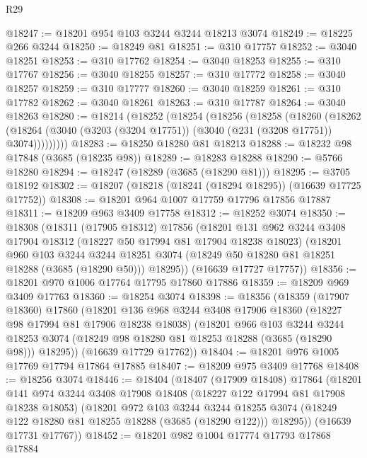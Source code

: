 \begin{lexlean}{R29}
\begin{coremodule}
@18247 := @18201 @954 @103 @3244 @3244 @18213 @3074
@18249 := @18225 @266 @3244
@18250 := @18249 @81
@18251 := @310 @17757
@18252 := @3040 @18251
@18253 := @310 @17762
@18254 := @3040 @18253
@18255 := @310 @17767
@18256 := @3040 @18255
@18257 := @310 @17772
@18258 := @3040 @18257
@18259 := @310 @17777
@18260 := @3040 @18259
@18261 := @310 @17782
@18262 := @3040 @18261
@18263 := @310 @17787
@18264 := @3040 @18263
@18280 := @18214
    (@18252
      (@18254
        (@18256
          (@18258
            (@18260
              (@18262
                (@18264 (@3040 (@3203 (@3204 @17751)) (@3040 (@231 (@3208 @17751)) @3074)))))))))
@18283 := @18250 @18280 @81 @18213
@18288 := @18232 @98 @17848 (@3685 (@18235 @98))
@18289 := @18283 @18288
@18290 := @5766 @18280
@18294 := @18247 (@18289 (@3685 (@18290 @81)))
@18295 := @3705 @18192
@18302 := @18207 (@18218 (@18241 (@18294 @18295)) (@16639 @17725 @17752))
@18308 := @18201 @964 @1007 @17759 @17796 @17856 @17887
@18311 := @18209 @963 @3409 @17758
@18312 := @18252 @3074
@18350 := @18308
    (@18311
      (@17905 @18312)
      @17856
      (@18201
        @131
        @962
        @3244
        @3408
        @17904
        @18312
        (@18227 @50 @17994 @81 @17904 @18238 @18023)
        (@18201
          @960
          @103
          @3244
          @3244
          @18251
          @3074
          (@18249 @50 @18280 @81 @18251 @18288 (@3685 (@18290 @50)))
          @18295))
      (@16639 @17727 @17757))
@18356 := @18201 @970 @1006 @17764 @17795 @17860 @17886
@18359 := @18209 @969 @3409 @17763
@18360 := @18254 @3074
@18398 := @18356
    (@18359
      (@17907 @18360)
      @17860
      (@18201
        @136
        @968
        @3244
        @3408
        @17906
        @18360
        (@18227 @98 @17994 @81 @17906 @18238 @18038)
        (@18201
          @966
          @103
          @3244
          @3244
          @18253
          @3074
          (@18249 @98 @18280 @81 @18253 @18288 (@3685 (@18290 @98)))
          @18295))
      (@16639 @17729 @17762))
@18404 := @18201 @976 @1005 @17769 @17794 @17864 @17885
@18407 := @18209 @975 @3409 @17768
@18408 := @18256 @3074
@18446 := @18404
    (@18407
      (@17909 @18408)
      @17864
      (@18201
        @141
        @974
        @3244
        @3408
        @17908
        @18408
        (@18227 @122 @17994 @81 @17908 @18238 @18053)
        (@18201
          @972
          @103
          @3244
          @3244
          @18255
          @3074
          (@18249 @122 @18280 @81 @18255 @18288 (@3685 (@18290 @122)))
          @18295))
      (@16639 @17731 @17767))
@18452 := @18201 @982 @1004 @17774 @17793 @17868 @17884

\end{coremodule}
\end{lexlean}
